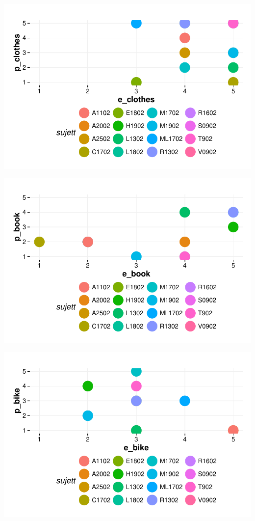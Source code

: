 \documentclass{article}
\begin{document}
\includegraphics{interviews/interviews-plot_coirs_parent_enfant_clothes}

\includegraphics{interviews/interviews-plot_coirs_parent_enfant_book}

\includegraphics{interviews/interviews-plot_coirs_parent_enfant_bike}
\end{document}
